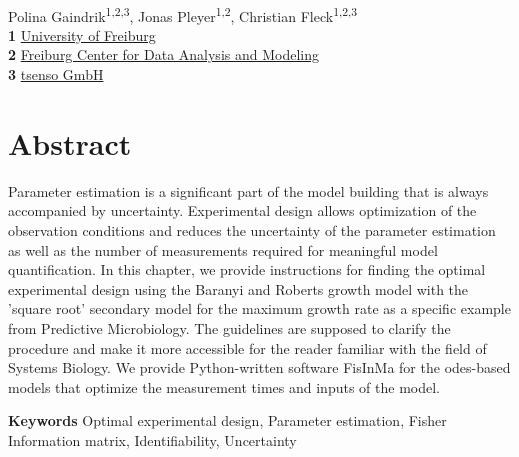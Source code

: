 \documentclass[10pt,A4paper]{article}
\providecommand{\keywords}[1]{\textbf{Keywords } #1}
\begin{document}
\vspace*{0.2in}
\begin{flushleft}
{\Large
\textbf{}}
\newline
\\
Polina Gaindrik\textsuperscript{1,2,3},
Jonas Pleyer\textsuperscript{1,2},
Christian Fleck\textsuperscript{1,2,3}
\\
\bigskip
\textbf{1} \href{https://www.fdm.uni-freiburg.de/spatsysbio}{University of Freiburg}\\
\textbf{2} \href{https://www.fdm.uni-freiburg.de/spatsysbio}{Freiburg Center for Data Analysis and Modeling}\\
\textbf{3} \href{https://tsenso.com/en/}{tsenso GmbH}\\
\bigskip

\end{flushleft}
\section*{Abstract}
\linenumbers
Parameter estimation is a significant part of the model building that is always accompanied by uncertainty.
Experimental design allows optimization of the observation conditions and reduces the uncertainty of the parameter estimation as well as the number of measurements required for meaningful model quantification.
In this chapter, we provide instructions for finding the optimal experimental design using the Baranyi and Roberts growth model with the 'square root' secondary model for the maximum growth rate as a specific example from Predictive Microbiology. 
The guidelines are supposed to clarify the procedure and make it more accessible for the reader familiar with the field of Systems Biology.
We provide Python-written software FisInMa for the \acp{ode}-based models that optimize the measurement times and inputs of the model.


\keywords{Optimal experimental design, Parameter estimation, Fisher Information matrix, Identifiability, Uncertainty}

%
%
%
\end{document}
